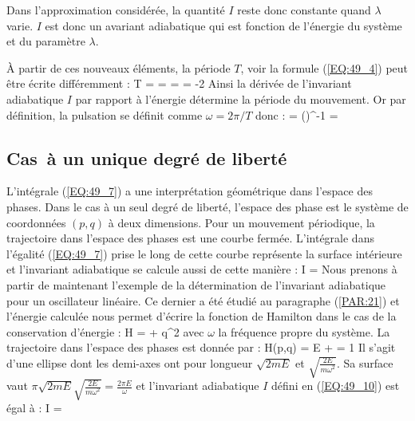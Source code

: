 Dans l'approximation consid\'{e}r\'{e}e, la quantit\'{e} $I$ reste donc constante quand $\lambda$ varie. $I$ est donc un avariant adiabatique qui est fonction de l'\'{e}nergie du syst\`{e}me et du param\`{e}tre $\lambda$.

\`{A} partir de ces nouveaux \'{e}l\'{e}ments, la p\'{e}riode $T$, voir la formule (\ref{EQ:49_4}) peut \^{e}tre \'{e}crite diff\'{e}remment :
\be
	T =  =  =  = -2\pi{} \label{EQ:49_8}
\ee
Ainsi la d\'{e}riv\'{e}e de l'invariant adiabatique $I$ par rapport \`{a} l'\'{e}nergie d\'{e}termine la p\'{e}riode du mouvement. Or par d\'{e}finition, la pulsation se d\'{e}finit comme $\omega = 2\pi/T$ donc :
\be
	\omega = \left(\right)^{-1} =  \label{EQ:49_9}
\ee

\subsection{Cas \`{a} un unique degr\'{e} de libert\'{e}}\label{PAR:49_2}

L'int\'{e}grale (\ref{EQ:49_7}) a une interpr\'{e}tation g\'{e}om\'{e}trique dans l'espace des phases. Dans le cas \`{a} un seul degr\'{e} de libert\'{e}, l'espace des phase est le syst\`{e}me de coordonn\'{e}es $(p,q)$ \`{a} deux dimensions. Pour un mouvement p\'{e}riodique, la trajectoire dans l'espace des phases est une courbe ferm\'{e}e. L'int\'{e}grale dans l'\'{e}galit\'{e} (\ref{EQ:49_7}) prise le long de cette courbe repr\'{e}sente la surface int\'{e}rieure et l'invariant adiabatique se calcule aussi de cette mani\`{e}re :
\be
	I =  \label{EQ:49_10}
\ee
Nous prenons \`{a} partir de maintenant l'exemple de la d\'{e}termination de l'invariant adiabatique pour un oscillateur lin\'{e}aire. Ce dernier a \'{e}t\'{e} \'{e}tudi\'{e} au paragraphe (\ref{PAR:21}) et l'\'{e}nergie calcul\'{e}e nous permet d'\'{e}crire la fonction de Hamilton dans le cas de la conservation d'\'{e}nergie :
\be
	H =  + q^{2} \label{EQ:49_11}
\ee
avec $\omega$ la fr\'{e}quence propre du syst\`{e}me. La trajectoire dans l'espace des phases est donn\'{e}e par :
\benn
	H(p,q) = E \Leftrightarrow {} +  = 1
\eenn
Il s'agit d'une ellipse dont les demi-axes ont pour longueur $\sqrt{2mE}$ et $\sqrt{\frac{2E}{m\omega^{2}}}$. Sa surface vaut $\pi\sqrt{2mE}\sqrt{\frac{2E}{m\omega^{2}}} = \frac{2\pi E}{\omega}$ et l'invariant adiabatique $I$ d\'{e}fini en (\ref{EQ:49_10}) est \'{e}gal \`{a} :
\be
	I =  \label{EQ:49_12}
\ee

